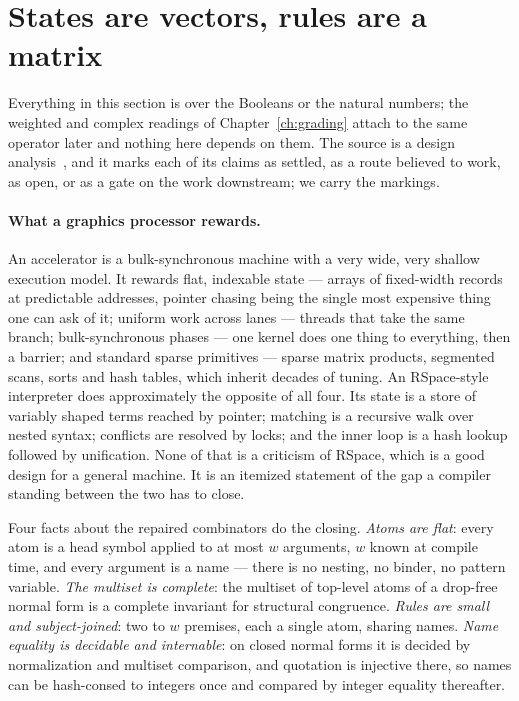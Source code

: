 \section{States are vectors, rules are a matrix}
\label{cb:sec:matrix}

Everything in this section is over the Booleans or the natural numbers; the weighted and
complex readings of Chapter~\ref{ch:grading} attach to the same operator later and nothing
here depends on them. The source is a design analysis~\cite{rhocombmat}, and it marks
each of its claims as settled, as a route believed to work, as open, or as a gate on the
work downstream; we carry the markings.

\paragraph{What a graphics processor rewards.} An accelerator is a bulk-synchronous machine
with a very wide, very shallow execution model. It rewards flat, indexable state --- arrays
of fixed-width records at predictable addresses, pointer chasing being the single most
expensive thing one can ask of it; uniform work across lanes --- threads that take the same
branch; bulk-synchronous phases --- one kernel does one thing to everything, then a
barrier; and standard sparse primitives --- sparse matrix products, segmented scans, sorts
and hash tables, which inherit decades of tuning. An RSpace-style interpreter does
approximately the opposite of all four. Its state is a store of variably shaped terms
reached by pointer; matching is a recursive walk over nested syntax; conflicts are
resolved by locks; and the inner loop is a hash lookup followed by unification. None of
that is a criticism of RSpace, which is a good design for a general machine. It is an
itemized statement of the gap a compiler standing between the two has to close.

Four facts about the repaired combinators do the closing. \emph{Atoms are flat}: every atom
is a head symbol applied to at most $w$ arguments, $w$ known at compile time, and every
argument is a name --- there is no nesting, no binder, no pattern variable. \emph{The
multiset is complete}: the multiset of top-level atoms of a drop-free normal form is a
complete invariant for structural congruence. \emph{Rules are small and subject-joined}:
two to $w$ premises, each a single atom, sharing names. \emph{Name equality is decidable and
internable}: on closed normal forms it is decided by normalization and multiset comparison,
and quotation is injective there, so names can be hash-consed to integers once and
compared by integer equality thereafter.

